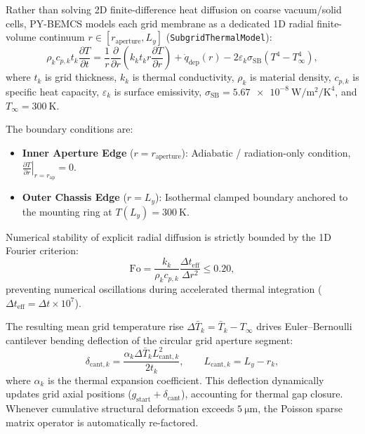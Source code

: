 \documentclass[11pt,a4paper]{article}
\newcommand{\PYBEMCS}{PY-BEMCS}
\begin{document}
Rather than solving 2D finite-difference heat diffusion on coarse vacuum/solid cells, \PYBEMCS{} models each grid membrane as a dedicated 1D radial finite-volume continuum $r \in [r_{\mathrm{aperture}}, L_y]$ (\texttt{SubgridThermalModel}):
\begin{equation}
    \rho_k c_{p,k} t_k \frac{\partial T}{\partial t} = \frac{1}{r} \frac{\partial}{\partial r}\left(k_k t_k r \frac{\partial T}{\partial r}\right) + \dot{q}_{\mathrm{dep}}(r) - 2 \varepsilon_k \sigma_{\mathrm{SB}} \left(T^4 - T_{\infty}^4\right),
\end{equation}
where $t_k$ is grid thickness, $k_k$ is thermal conductivity, $\rho_k$ is material density, $c_{p,k}$ is specific heat capacity, $\varepsilon_k$ is surface emissivity, $\sigma_{\mathrm{SB}} = \SI{5.67e-8}{\watt\per\meter\squared\per\kelvin\tothe{4}}$, and $T_{\infty} = \SI{300}{\kelvin}$.

The boundary conditions are:
\begin{itemize}[nosep]
    \item \textbf{Inner Aperture Edge} ($r = r_{\mathrm{aperture}}$): Adiabatic / radiation-only condition, $\left.\frac{\partial T}{\partial r}\right|_{r = r_{\mathrm{ap}}} = 0$.
    \item \textbf{Outer Chassis Edge} ($r = L_y$): Isothermal clamped boundary anchored to the mounting ring at $T(L_y) = \SI{300}{\kelvin}$.
\end{itemize}

Numerical stability of explicit radial diffusion is strictly bounded by the 1D Fourier criterion:
\begin{equation}
    \mathrm{Fo} = \frac{k_k}{\rho_k c_{p,k}} \frac{\Delta t_{\mathrm{eff}}}{\Delta r^2} \le 0.20,
\end{equation}
preventing numerical oscillations during accelerated thermal integration ($\Delta t_{\mathrm{eff}} = \Delta t \times 10^7$).

The resulting mean grid temperature rise $\Delta \bar{T}_k = \bar{T}_k - T_{\infty}$ drives Euler--Bernoulli cantilever bending deflection of the circular grid aperture segment:
\begin{equation}
    \delta_{\mathrm{cant},k} = \frac{\alpha_k \Delta \bar{T}_k L_{\mathrm{cant},k}^2}{2 t_k}, \qquad L_{\mathrm{cant},k} = L_y - r_k,
\end{equation}
where $\alpha_k$ is the thermal expansion coefficient. This deflection dynamically updates grid axial positions ($g_{\mathrm{start}} + \delta_{\mathrm{cant}}$), accounting for thermal gap closure. Whenever cumulative structural deformation exceeds $\SI{5}{\micro\meter}$, the Poisson sparse matrix operator is automatically re-factored.
\end{document}
